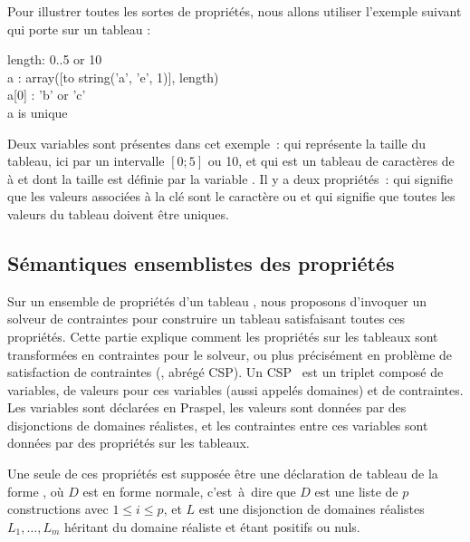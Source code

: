 \begin{example}
\label{example:data:array_proprietes}
Pour illustrer toutes les sortes de propriétés, nous allons utiliser l'exemple
suivant qui porte sur un tableau :

\begin{pre}
length: 0..5 or 10 \\
a     : array([to string('a', 'e', 1)], length) \\
a[0]  : 'b' or 'c' \\
a is unique
\end{pre}

Deux variables sont présentes dans cet exemple~:  qui représente la
taille du tableau, ici par un intervalle $[0; 5]$ ou 10, et  qui est un
tableau de caractères de  à  et dont la taille est définie par
la variable . Il y a deux propriétés~:  qui
signifie que les valeurs associées à la clé  sont le caractère
 ou  et  qui signifie que toutes les
valeurs du tableau doivent être uniques.

\end{example}

\subsection{Sémantiques ensemblistes des propriétés}

Sur un ensemble de propriétés d'un tableau , nous proposons d'invoquer
un solveur de contraintes pour construire un tableau satisfaisant toutes ces
propriétés. Cette partie explique comment les propriétés sur les tableaux sont
transformées en contraintes pour le solveur, ou plus précisément en problème de
satisfaction de contraintes (, abrégé
CSP). Un CSP~ est un triplet composé de variables, de valeurs
pour ces variables (aussi appelés domaines) et de contraintes. Les variables
sont déclarées en Praspel, les valeurs sont données par des disjonctions de
domaines réalistes, et les contraintes entre ces variables sont données par des
propriétés sur les tableaux.

Une seule de ces propriétés est supposée être une déclaration de tableau de la
forme , où $D$ est en forme normale, c'est~à~dire que
$D$ est une liste de $p$ constructions  avec $1 \leq i
\leq p$, et $L$ est une disjonction de domaines réalistes $L_1, \dots, L_m$
héritant du domaine réaliste  et étant positifs ou nuls.


